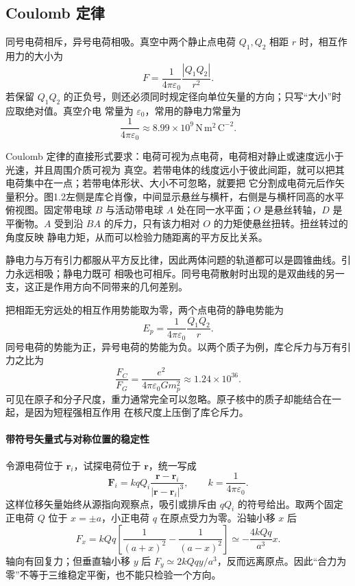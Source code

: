 \subsection*{Coulomb 定律}

同号电荷相斥，异号电荷相吸。真空中两个静止点电荷 $Q_1,Q_2$ 相距 $r$ 时，相互作用力的大小为
\begin{equation}
  \boxed{F=\frac{1}{4\pi\varepsilon_0}\frac{|Q_1Q_2|}{r^2}}.
\end{equation}
若保留 $Q_1Q_2$ 的正负号，则还必须同时规定径向单位矢量的方向；只写“大小”时应取绝对值。真空介电
常量为 $\varepsilon_0$，常用的静电力常量为
\begin{equation}
  \boxed{\frac{1}{4\pi\varepsilon_0}
  \approx8.99\times10^9
  \,\mathrm{N\,m^2\,C^{-2}}}.
\end{equation}

Coulomb 定律的直接形式要求：电荷可视为点电荷，电荷相对静止或速度远小于光速，并且周围介质可视为
真空。若带电体的线度远小于彼此间距，就可以把其电荷集中在一点；若带电体形状、大小不可忽略，就要把
它分割成电荷元后作矢量积分。图1.2左侧是库仑肖像，中间显示悬丝与横杆，右侧是与横杆同高的水平俯视图。固定带电球 $B$ 与活动带电球 $A$ 处在同一水平面；$O$ 是悬丝转轴，$D$ 是平衡物。$A$ 受到沿 $BA$ 的斥力，只有该力相对 $O$ 的力矩使悬丝扭转。扭丝转过的角度反映
静电力矩，从而可以检验力随距离的平方反比关系。

\coulombHistoryFigure
{}

静电力与万有引力都服从平方反比律，因此两体问题的轨道都可以是圆锥曲线。引力永远相吸；静电力既可
相吸也可相斥。同号电荷散射时出现的是双曲线的另一支，这正是作用方向不同带来的几何差别。

把相距无穷远处的相互作用势能取为零，两个点电荷的静电势能为
\begin{equation}
  \boxed{E_p=\frac{1}{4\pi\varepsilon_0}\frac{Q_1Q_2}{r}}.
\end{equation}
同号电荷的势能为正，异号电荷的势能为负。以两个质子为例，库仑斥力与万有引力之比为
\begin{equation}
  \frac{F_C}{F_G}
  =\frac{e^2}{4\pi\varepsilon_0Gm_p^2}
  \approx1.24\times10^{36}.
\end{equation}
可见在原子和分子尺度，重力通常完全可以忽略。原子核中的质子却能结合在一起，是因为短程强相互作用
在核尺度上压倒了库仑斥力。


\paragraph{带符号矢量式与对称位置的稳定性}
令源电荷位于 $\boldsymbol r_i$，试探电荷位于 $\boldsymbol r$，统一写成
\[
 \boldsymbol F_i=kqQ_i\frac{\boldsymbol r-\boldsymbol r_i}{|\boldsymbol r-\boldsymbol r_i|^3},
 \qquad k=\frac1{4\pi\varepsilon_0}.
\]
这样位移矢量始终从源指向观察点，吸引或排斥由 $qQ_i$ 的符号给出。取两个固定正电荷 $Q$ 位于 $x=\pm a$，小正电荷 $q$ 在原点受力为零。沿轴小移 $x$ 后
\[
 F_x=kQq\left[\frac1{(a+x)^2}-\frac1{(a-x)^2}\right]
 \simeq-\frac{4kQq}{a^3}x.
\]
轴向有回复力；但垂直轴小移 $y$ 后 $F_y\simeq2kQq y/a^3$，反而远离原点。因此“合力为零”不等于三维稳定平衡，也不能只检验一个方向。

